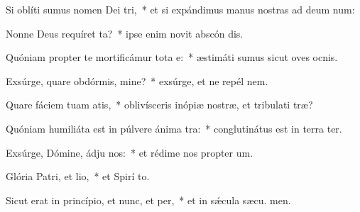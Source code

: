 \item Si oblíti sumus nomen Dei tri,~* et si expándimus manus nostras ad deum num:
\item Nonne Deus requíret ta?~* ipse enim novit abscón dis.
\item Quóniam propter te mortificámur tota e:~* æstimáti sumus sicut oves ocnis.
\item Exsúrge, quare obdórmis, mine?~* exsúrge, et ne repél  nem.
\item Quare fáciem tuam atis,~* oblivísceris inópiæ nostræ, et tribulati træ?
\item Quóniam humiliáta est in púlvere ánima tra:~* conglutinátus est in terra  ter.
\item Exsúrge, Dómine, ádju nos:~* et rédime nos propter  um.
\item Glória Patri, et lio,~* et Spirí to.
\item Sicut erat in princípio, et nunc, et per,~* et in sǽcula sæcu. men.

